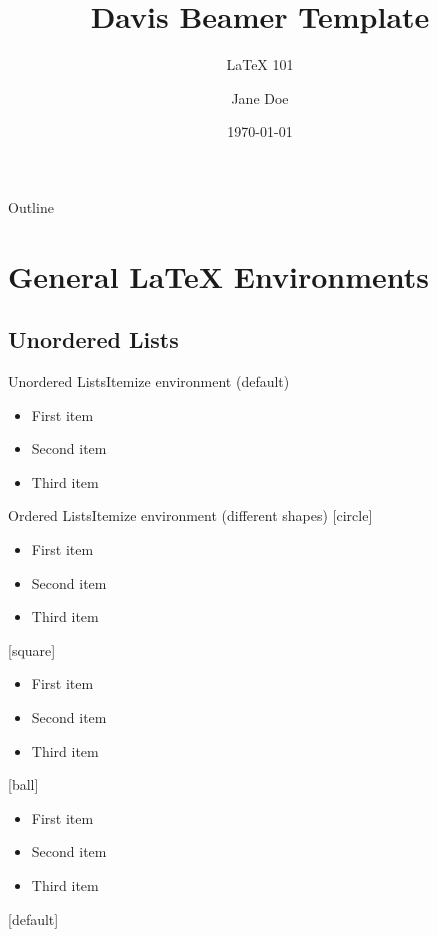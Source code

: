 \documentclass{beamer}
\title {Davis Beamer Template}
\subtitle{\LaTeX{} 101}
\author{Jane Doe}
\institute{UC Davis GradPathways}
\date{\today}
\begin{document}
    \begin{frame}
      \titlepage
    \end{frame}

    \label{Outline}
    \begin{frame}{Outline}
      \tableofcontents
    \end{frame}

    \section{General \LaTeX{} Environments}

    \subsection{Unordered Lists}

    \begin{frame}{Unordered Lists}{Itemize environment (default)}
    \begin{itemize}
        \item First item
        \item Second item
        \item Third item
    \end{itemize}
    \end{frame}

    \begin{frame}{Ordered Lists}{Itemize environment (different shapes)}
    [circle]
    \begin{itemize}
        \item First item
        \item Second item
        \item Third item
    \end{itemize}

    [square]
    \begin{itemize}
        \item First item
        \item Second item
        \item Third item
    \end{itemize}

    [ball]
    \begin{itemize}
        \item First item
        \item Second item
        \item Third item
    \end{itemize}

    [default] %

    \end{frame}
\end{document}
